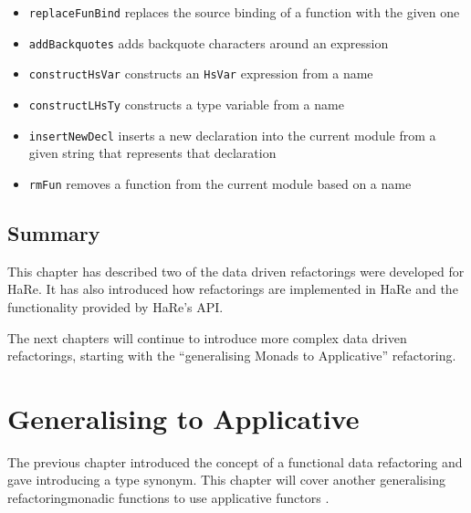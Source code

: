 \begin{itemize}
{}\DIFaddend \item \texttt{replaceFunBind} replaces the source binding of a function with the given one\DIFaddbegin {}\DIFaddend \item \texttt{addBackquotes} adds backquote characters around an expression\DIFaddbegin {}\DIFaddend \item \texttt{constructHsVar} constructs an \texttt{HsVar} expression from a name\DIFaddbegin {}\DIFaddend \item \texttt{constructLHsTy} constructs a type variable from a name\DIFaddbegin {}\DIFaddend \item \texttt{insertNewDecl} inserts a new declaration into the current module from a given string that represents that declaration\DIFaddbegin {}\DIFaddend \item \texttt{rmFun} removes a function from the current module based on a name\DIFaddbegin {}\DIFaddend \end{itemize}


\section{Summary}

This chapter has described two of the data driven refactorings were developed for HaRe. It has also introduced how refactorings are implemented in HaRe and the functionality provided by HaRe's API.

The next chapters will continue to introduce more complex data driven refactorings, starting with the ``generalising Monads to Applicative'' refactoring.


\DIFdelbegin %
\DIFdelend %

\chapter{Generalising \DIFdelbegin {}\DIFdelend \DIFaddbegin {}\DIFaddend to Applicative \DIFaddbegin {}\DIFaddend }
\DIFaddbegin {}
\DIFaddend \label{chp:applicative}

The previous chapter introduced the concept of a functional data refactoring and gave \DIFdelbegin {}\DIFdelend \DIFaddbegin {}\DIFaddend introducing a type synonym\DIFdelbegin {}\DIFdelend \DIFaddbegin {}\DIFaddend . This chapter will cover another generalising refactoring\DIFdelbegin {}\DIFdelend \DIFaddbegin {}\DIFaddend monadic functions to use applicative functors \DIFaddbegin {}\DIFaddend . 

